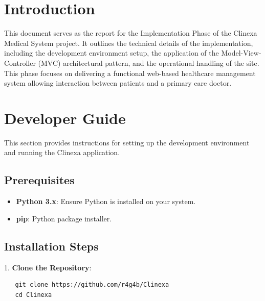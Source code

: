 \documentclass[12pt,a4paper]{article}
\begin{document}
\tableofcontents
\newpage


\section{Introduction}

This document serves as the report for the Implementation Phase of the Clinexa Medical System project. It outlines the technical details of the implementation, including the development environment setup, the application of the Model-View-Controller (MVC) architectural pattern, and the operational handling of the site. This phase focuses on delivering a functional web-based healthcare management system allowing interaction between patients and a primary care doctor.


\section{Developer Guide}

This section provides instructions for setting up the development environment and running the Clinexa application.

\subsection{Prerequisites}
\begin{itemize}
    \item \textbf{Python 3.x}: Ensure Python is installed on your system.
    \item \textbf{pip}: Python package installer.
\end{itemize}

\subsection{Installation Steps}
1. \textbf{Clone the Repository}:
   \begin{verbatim}
   git clone https://github.com/r4g4b/Clinexa
   cd Clinexa
   \end{verbatim}
\end{document}
